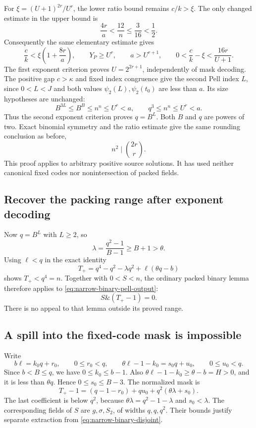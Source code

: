 For $\xi=(U+1)^{2r}/U^r$, the lower ratio bound remains
$c/k>\xi$. The only changed estimate in the upper bound is
\[
 \frac{4r}{a}<\frac{12}{n}\le\frac3{16}<\frac12.
\]
Consequently the same elementary estimate gives
\[
 \frac ck<\xi\left(1+\frac{8r}{a}\right),\qquad
 Y_P\ge U^r,\qquad a>U^{r+1},\qquad
 0<\frac ck-\xi<\frac{16r}{U+1}.
\]
The first exponent criterion proves $U=2^{2r+1}$, independently of
mask decoding. The positive gap $c>\kappa$ and fixed index congruence
give the second Pell index $L$, since $0<L<J$ and both values
$\psi_2(L),\psi_2(t_0)$ are less than $a$. Its size hypotheses are
unchanged:
\[
 B^{3L}\le B^B\le n^n\le U^r<a,
 \qquad q^3\le n^n\le U^r<a.
\]
Thus the second exponent criterion proves $q=B^L$. Both $B$ and $q$
are powers of two. Exact binomial symmetry and the ratio estimate give
the same rounding conclusion as before,
\begin{equation}\label{eq:narrow-binary-pell-output}
 n^2\mid\binom{2r}{r}.
\end{equation}
This proof applies to arbitrary positive source solutions. It has used
neither canonical fixed codes nor nonintersection of packed fields.

\subsection{Recover the packing range after exponent decoding}

Now $q=B^L$ with $L\ge2$, so
\[
 \lambda=\frac{q^2-1}{B-1}\ge B+1>\theta.
\]
Using $\ell<q$ in the exact identity
\[
 T_+=q^4-q^2-\lambda q^2+\ell(\theta q-b)
\]
shows $T_+<q^4=n$. Together with $0<S<n$, the ordinary packed
binary lemma therefore applies to \eqref{eq:narrow-binary-pell-output}:
\begin{equation}\label{eq:narrow-binary-disjoint}
 S\mathbin{\&}(T_+-1)=0.
\end{equation}
There is no appeal to that lemma outside its proved range.

\subsection{A spill into the fixed-code mask is impossible}

Write
\[
 b\ell=k_0q+r_0,\qquad 0\le r_0<q,
 \qquad \theta\ell-1-k_0=s_0q+u_0,\qquad 0\le u_0<q.
\]
Since $b<B\le q$, we have $0\le k_0\le b-1$. Also
$\theta\ell-1-k_0\ge\theta-b=H>0$, and it is less than
$\theta q$. Hence $0\le s_0\le B-3$. The normalized mask is
\begin{equation}\label{eq:narrow-binary-normalized}
 T_+-1=(q-1-r_0)+qu_0+q^2(\theta\lambda+s_0).
\end{equation}
The last coefficient is below $q^2$, because
$\theta\lambda=q^2-1-\lambda$ and $s_0<\lambda$.
The corresponding fields of $S$ are $g,\sigma,S_2$, of widths
$q,q,q^2$. Their bounds justify separate extraction from
\eqref{eq:narrow-binary-disjoint}.

